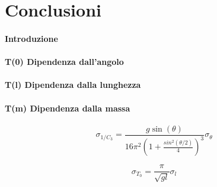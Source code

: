 \documentclass{article}
\begin{document}
	\section{Conclusioni}
	\paragraph{Introduzione}

	
	\paragraph{T(0) Dipendenza dall'angolo}
	
	
	\paragraph{T(l) Dipendenza dalla lunghezza}	
	\paragraph{T(m) Dipendenza dalla massa}
	
	
	\[
	\sigma_{1/C_3} = \frac{g\sin{(\theta)}}{16\pi^2\left(1 + \frac{sin^2{(\theta/2)}}{4}\right)^3} \sigma_\theta
	\]
	
	\[
	\sigma_{T_0} = \frac{\pi}{\sqrt{gl}} \sigma_l
	\]
	
	
	
	
\end{document}
